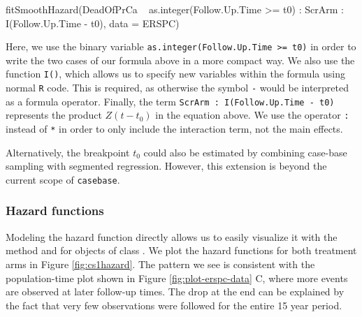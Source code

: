 \begin{Schunk}
\begin{Sinput}
fitSmoothHazard(DeadOfPrCa ~ as.integer(Follow.Up.Time >= t0) :
                    ScrArm : I(Follow.Up.Time - t0),
                data = ERSPC)
\end{Sinput}
\end{Schunk}

\noindent Here, we use the binary variable
\texttt{as.integer(Follow.Up.Time\ \textgreater{}=\ t0)} in order to
write the two cases of our formula above in a more compact way. We also
use the function \texttt{I()}, which allows us to specify new variables
within the formula using normal \texttt{R} code. This is required, as
otherwise the symbol \texttt{-} would be interpreted as a formula
operator. Finally, the term \texttt{ScrArm\ :\ I(Follow.Up.Time\ -\ t0)}
represents the product \(Z (t - t_0)\) in the equation above. We use the
operator \texttt{:} instead of \texttt{*} in order to only include the
interaction term, not the main effects.

Alternatively, the breakpoint \(t_0\) could also be estimated by
combining case-base sampling with segmented regression. However, this
extension is beyond the current scope of \texttt{casebase}.

\hypertarget{hazard-functions}{%
\subsubsection{Hazard functions}\label{hazard-functions}}

Modeling the hazard function directly allows us to easily visualize it
with the  method and  for objects of
class . We plot the hazard functions for both
treatment arms in Figure \ref{fig:cs1hazard}. The pattern we see is
consistent with the population-time plot shown in Figure
\ref{fig:plot-erspc-data} C, where more events are observed at later
follow-up times. The drop at the end can be explained by the fact that
very few observations were followed for the entire 15 year period.

